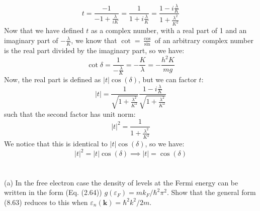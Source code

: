 \documentclass[12pt]{article}
\begin{document}
\begin{equation}
    t = \frac{-1}{-1 + \frac{\lambda}{iK}} = \frac{1}{1 + i\frac{\lambda}{K}} = \frac{1 - i\frac{\lambda}{K}}{1 + \frac{\lambda^2}{K^2}}
\end{equation}
Now that we have defined \( t \) as a complex number, with a real part of 1 and an imaginary part of \( -\frac{\lambda}{K} \), we know that \( \cot = \frac{\cos}{\sin} \) of an arbitrary complex number is the real part divided by the imaginary part, so we have:
\begin{equation}
    \cot \delta = \frac{1}{-\frac{\lambda}{K}} = -\frac{K}{\lambda} = -\frac{h^2 K}{mg}
\end{equation}
Now, the real part is defined as \( |t| \cos(\delta) \), but we can factor \( t \):
\begin{equation}
    |t| = \frac{1}{\sqrt{1 + \frac{\lambda^2}{K^2}}}\frac{1 - i\frac{\lambda}{K}}{\sqrt{1 + \frac{\lambda^2}{K^2}}}
\end{equation}
such that the second factor has unit norm:
\begin{equation}
    |t|^2 = \frac{1}{1 + \frac{\lambda^2}{K^2}}
\end{equation}
We notice that this is identical to \( |t| \cos(\delta) \), so we have:
\begin{equation}
    |t|^2 = |t| \cos(\delta) \implies |t| = \cos(\delta)
\end{equation}
\section{}
\subsection{}
(a) In the free electron case the density of levels at the Fermi energy can be written in the form (Eq. (2.64)) $g\left(\varepsilon_F\right)=m k_F / \hbar^2 \pi^2$. Show that the general form (8.63) reduces to this when $\varepsilon_n(\mathbf{k})=\hbar^2 k^2 / 2 m$.
\end{document}
